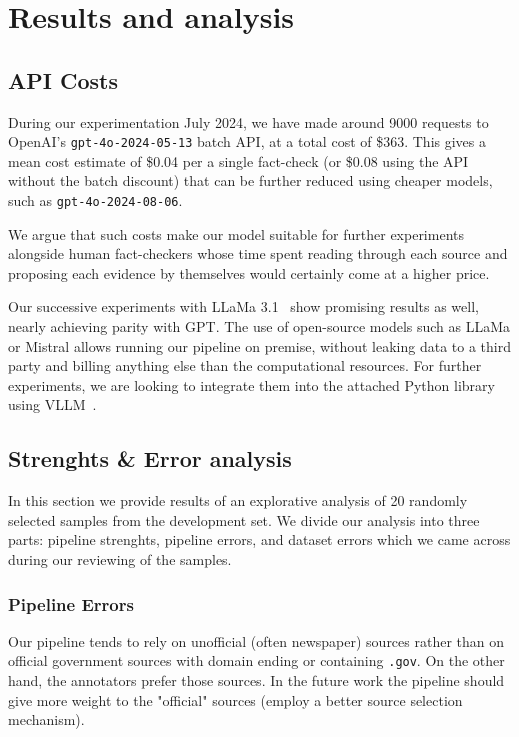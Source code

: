 
\section{Results and analysis}
\label{sec:results}



\subsection{API Costs}
During our experimentation July 2024, we have made around 9000 requests to OpenAI's \texttt{gpt-4o-2024-05-13} batch API, at a total cost of \$363.
This gives a mean cost estimate of \$0.04 per a single fact-check (or \$0.08 using the API without the batch discount) that can be further reduced using cheaper models, such as \texttt{gpt-4o-2024-08-06}.

We argue that such costs make our model suitable for further experiments alongside human fact-checkers whose time spent reading through each source and proposing each evidence by themselves would certainly come at a higher price.

Our successive experiments with LLaMa 3.1~\cite{meta2024llama31} show promising results as well, nearly achieving parity with GPT.
The use of open-source models such as LLaMa or Mistral allows running our pipeline on premise, without leaking data to a third party and billing anything else than the computational resources.
For further experiments, we are looking to integrate them into the attached Python library using VLLM~\cite{vllm}.

\subsection{Strenghts \& Error analysis}
In this section we provide results of an explorative analysis of 20 randomly selected samples from the development set. We divide our analysis into three parts: pipeline strenghts, pipeline errors, and dataset errors which we came across during our reviewing of the samples.


\subsubsection*{Pipeline Errors}
Our pipeline tends to rely on unofficial (often newspaper) sources rather than on official government sources with domain ending or containing \texttt{.gov}. On the other hand, the annotators prefer those sources. In the future work the pipeline should give more weight to the "official" sources (employ a better source selection mechanism).

